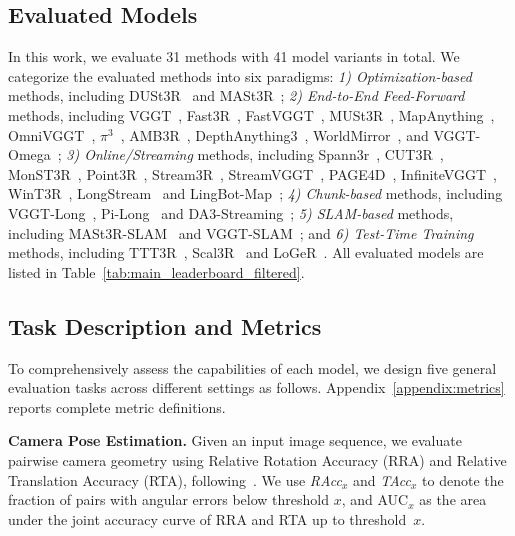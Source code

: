 \subsection{Evaluated Models} 
In this work, we evaluate 31 methods with 41 model variants in total. 
%
We categorize the evaluated methods into six paradigms: \textit{1) Optimization-based} methods, including DUSt3R~\citep{wang2024dust3r} and MASt3R~\citep{leroy2024mast3r}; \textit{2) End-to-End Feed-Forward} methods, including VGGT~\citep{wang2025vggt}, Fast3R~\citep{yang2025fast3r}, FastVGGT~\citep{shen2025fastvggt}, MUSt3R~\citep{cabon2025must3r}, MapAnything~\citep{keetha2026mapanything}, OmniVGGT~\citep{peng2025omnivggt}, $\pi^3$~\citep{wang2025pi3}, AMB3R~\citep{wang2025amb3r}, DepthAnything3~\citep{lin2025depth}, WorldMirror~\citep{liu2025worldmirror}, and VGGT-Omega~\citep{wang2026vggtomega};  \textit{3) Online/Streaming} methods, including Spann3r~\citep{wang2024spann3r}, CUT3R~\citep{wang2025cut3r}, MonST3R~\citep{zhang2024monst3r}, Point3R~\citep{point3r}, Stream3R~\citep{stream3r2025}, StreamVGGT~\citep{streamVGGT}, PAGE4D~\citep{zhou2025page4d}, InfiniteVGGT~\citep{yuan2026infinitevggt}, WinT3R~\citep{li2025wint3r}, LongStream~\citep{cheng2026longstream} and LingBot-Map~\citep{chen2026lingbotmap}; \textit{4) Chunk-based} methods, including VGGT-Long~\citep{deng2025vggtlong}, Pi-Long~\citep{deng2025vggtlong} and DA3-Streaming~\citep{deng2025vggtlong}; \textit{5) SLAM-based} methods, including MASt3R-SLAM~\citep{murai2024_mast3rslam} and VGGT-SLAM~\citep{maggio2025vggt-slam2}; and \textit{6) Test-Time Training} methods, including TTT3R~\citep{chen2025ttt3r}, Scal3R~\citep{xie2026scal3r} and LoGeR~\citep{zhang2026loger}.
%
All evaluated models are listed in Table~\ref{tab:main_leaderboard_filtered}. 

\subsection{Task Description and Metrics}
To comprehensively assess the capabilities of each model, we design five general evaluation tasks across different settings as follows. 
%
Appendix~\ref{appendix:metrics} reports complete metric definitions.

 
\textbf{Camera Pose Estimation.} Given an input image sequence, we evaluate pairwise camera geometry using Relative Rotation Accuracy (RRA) and Relative Translation Accuracy (RTA), following~\citet{wang2025vggt}.
%
We use \textit{RAcc}$_{x}$ and \textit{TAcc}$_{x}$ to denote the fraction of pairs with angular errors below threshold $x$, and AUC$_{x}$ as the area under the joint accuracy curve of RRA and RTA up to threshold~$x$.

